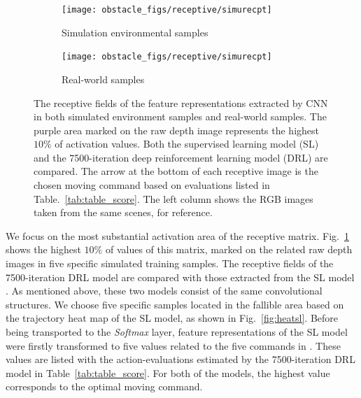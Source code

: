 \begin{figure}[!ht]
    \centering
    \begin{subfigure}[t]{0.48\columnwidth}
      \centering
      \texttt{[image: obstacle\_figs/receptive/simurecpt]}
      \caption{Simulation environmental samples}
      \label{fig:recep_simu}
    \end{subfigure}
    \begin{subfigure}[t]{0.48\columnwidth}
      \centering
      \texttt{[image: obstacle\_figs/receptive/simurecpt]}
      \caption{Real-world samples}
      \label{fig:recep_real}
    \end{subfigure}
    \caption{The receptive fields of the feature representations extracted by CNN in both simulated environment samples and real-world samples. The purple area marked on the raw depth image represents the highest $10\%$ of activation values. Both the supervised learning model (SL) and the 7500-iteration deep reinforcement learning model (DRL) are compared. The arrow at the bottom of each receptive image is the chosen moving command based on evaluations listed in Table.~\ref{tab:table_score}. The left column shows the RGB images taken from the same scenes, for reference.}
    \label{fig:recep}
\end{figure}

We focus on the most substantial activation area of the receptive matrix. Fig.~\ref{fig:recep_simu} shows the highest $10\%$ of values of this matrix, marked on the related raw depth images in five specific simulated training samples. The receptive fields of the 7500-iteration DRL model are compared with those extracted from the SL model \cite{tai2016deep}. As mentioned above, these two models consist of the same convolutional structures. We choose five specific samples located in the fallible area based on the trajectory heat map of the SL model, as shown in Fig.~\ref{fig:heatsl}. Before being transported to the \textit{Softmax} layer, feature representations of the SL model were firstly transformed to five values related to the five commands in \cite{tai2016deep}. These values are listed with the action-evaluations estimated by the 7500-iteration DRL model in Table~\ref{tab:table_score}. For both of the models, the highest value corresponds to the optimal moving command.


